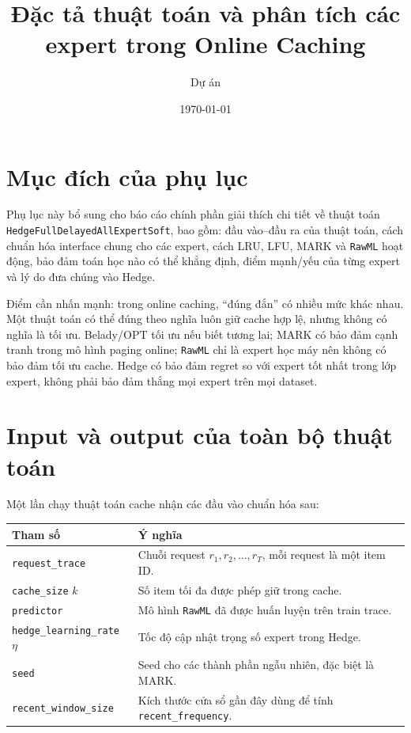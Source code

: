 \documentclass[11pt,a4paper]{article}
\title{\bfseries\sffamily Đặc tả thuật toán và phân tích các expert trong Online Caching}
\author{Dự án \code{tin03092006-cell/Online-Caching}}
\date{\today}
\newcommand{\code}[1]{\texttt{#1}}
\newcommand{\hedge}{\code{HedgeFullDelayedAllExpertSoft}}
\newcommand{\rawml}{\code{RawML}}
\begin{document}
\maketitle

\section{Mục đích của phụ lục}

Phụ lục này bổ sung cho báo cáo chính phần giải thích chi tiết về thuật toán \hedge{}, bao gồm: đầu vào--đầu ra của thuật toán, cách chuẩn hóa interface chung cho các expert, cách LRU, LFU, MARK và \rawml{} hoạt động, bảo đảm toán học nào có thể khẳng định, điểm mạnh/yếu của từng expert và lý do đưa chúng vào Hedge.

Điểm cần nhấn mạnh: trong online caching, ``đúng đắn'' có nhiều mức khác nhau. Một thuật toán có thể đúng theo nghĩa luôn giữ cache hợp lệ, nhưng không có nghĩa là tối ưu. Belady/OPT tối ưu nếu biết tương lai; MARK có bảo đảm cạnh tranh trong mô hình paging online; \rawml{} chỉ là expert học máy nên không có bảo đảm tối ưu cache. Hedge có bảo đảm regret so với expert tốt nhất trong lớp expert, không phải bảo đảm thắng mọi expert trên mọi dataset.

\section{Input và output của toàn bộ thuật toán}

Một lần chạy thuật toán cache nhận các đầu vào chuẩn hóa sau:

\begin{tabularx}{\textwidth}{lX}
\toprule
Tham số & Ý nghĩa \\
\midrule
\code{request\_trace} & Chuỗi request \(r_1,r_2,\ldots,r_T\), mỗi request là một item ID. \\
\code{cache\_size} \(k\) & Số item tối đa được phép giữ trong cache. \\
\code{predictor} & Mô hình \rawml{} đã được huấn luyện trên train trace. \\
\code{hedge\_learning\_rate} \(\eta\) & Tốc độ cập nhật trọng số expert trong Hedge. \\
\code{seed} & Seed cho các thành phần ngẫu nhiên, đặc biệt là MARK. \\
\code{recent\_window\_size} & Kích thước cửa sổ gần đây dùng để tính \code{recent\_frequency}. \\
\bottomrule
\end{tabularx}
\end{document}
